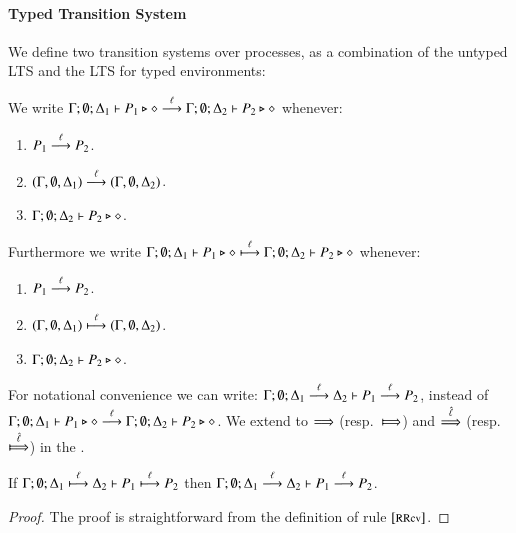 \paragraph{Typed Transition System}

We define two transition systems over processes, as a combination
of the untyped LTS and the LTS for typed environments:

\begin{definition}\label{d:tlts}\rm
	We write
	$\Gamma; \emptyset; \Delta_1 \proves P_1 \hastype \Proc \by{\ell} \Gamma; \emptyset; \Delta_2 \proves P_2 \hastype \Proc$
	whenever:
%
	\begin{enumerate}
		\item	$P_1 \by{\ell} P_2$.
		\item	$(\Gamma, \emptyset, \Delta_1) \by{\ell} (\Gamma, \emptyset, \Delta_2)$.
		\item	$\Gamma; \emptyset; \Delta_2 \proves P_2 \hastype \Proc$.
	\end{enumerate}
%

	Furthermore we write
	$\Gamma; \emptyset; \Delta_1 \proves P_1 \hastype \Proc \hby{\ell} \Gamma; \emptyset; \Delta_2 \proves P_2 \hastype \Proc$
	whenever:
%
	\begin{enumerate}
		\item	$P_1 \by{\ell} P_2$.
		\item	$(\Gamma, \emptyset, \Delta_1) \hby{\ell} (\Gamma, \emptyset, \Delta_2)$.
		\item	$\Gamma; \emptyset; \Delta_2 \proves P_2 \hastype \Proc$.
	\end{enumerate}
%
\end{definition}

For notational convenience we can write:
$\horel{\Gamma}{\Delta_1}{P_1}{\by{\ell}}{\Delta_2}{P_2}$,
instead of $\Gamma; \emptyset; \Delta_1 \proves P_1 \hastype \Proc \by{\ell} \Gamma; \emptyset; \Delta_2 \proves P_2 \hastype \Proc$.
We extend to $\By{}$ (resp.\ $\Hby{}$) and $\By{\hat{\ell}}$ (resp.\ $\Hby{\hat{\ell}}$) in the .

\begin{lemma}[Invariant]\label{l:invariant}
	If $\horel{\Gamma}{\Delta_1}{P_1}{\hby{\ell}}{\Delta_2}{P_2}$
	then $\horel{\Gamma}{\Delta_1}{P_1}{\by{\ell}}{\Delta_2}{P_2}$.
\end{lemma}

\begin{proof}
	The proof is straightforward from the definition of rule $\eltsrule{RRcv}$.
\end{proof}


